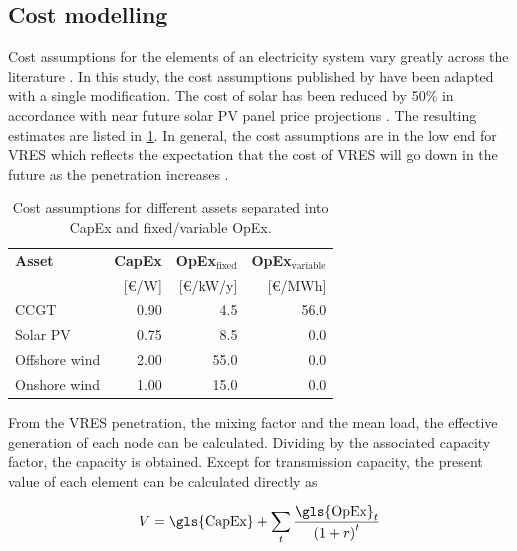 \documentclass[a4paper, 5p, sort&compress]{elsarticle}%
\newcommand{\paren}[1]{\left(#1\right)}
\begin{document}
\subsection{Cost modelling}
\label{sec:cost-modelling}

Cost assumptions for the elements of an electricity system vary
greatly across the literature \cite{Sensitivity}. In this study, the
cost assumptions published by \cite{Rolando} have been adapted with a
single modification. The cost of solar has been reduced by 50\% in
accordance with near future solar PV panel price projections
\cite{irena}. The resulting estimates are listed in
\cref{tab:cost-assumptions}. In general, the cost assumptions are in
the low end for VRES which reflects the expectation that the cost of
VRES will go down in the future as the penetration increases
\cite{Fraunhofer}.

\begin{table}[h!]
  \centering
  \caption{Cost assumptions for different assets separated into
    \gls{CapEx} and fixed/variable \gls{OpEx}.}
  \label{tab:cost-assumptions}
  \begin{tabular}{lrrr}  \toprule
    \textbf{Asset} & \textbf{\gls{CapEx} }& \textbf{\gls{OpEx}$_{\text{fixed}}$} & \textbf{\gls{OpEx}$_{\text{variable}}$}\\
    & [\euro/W] & [\euro/kW/y] & [\euro/MWh]\\ \midrule
    CCGT & 0.90 & 4.5 & 56.0\\
    Solar PV & 0.75 & 8.5 & 0.0\\
    Offshore wind & 2.00 & 55.0 & 0.0\\
    Onshore wind & 1.00 & 15.0 & 0.0\\
    \bottomrule
  \end{tabular}
\end{table}

From the VRES penetration, the mixing factor and the mean load, the
effective generation of each node can be calculated. Dividing by the
associated capacity factor, the capacity is obtained. Except for
transmission capacity, the present value of each element can be
calculated directly as

\begin{equation}
  \label{eq:6}
  V = \text{\gls{CapEx}} + \sum_{t} \frac{\text{\gls{OpEx}}_{t}}{\paren{1 + r}^{t}}
\end{equation}
\end{document}
